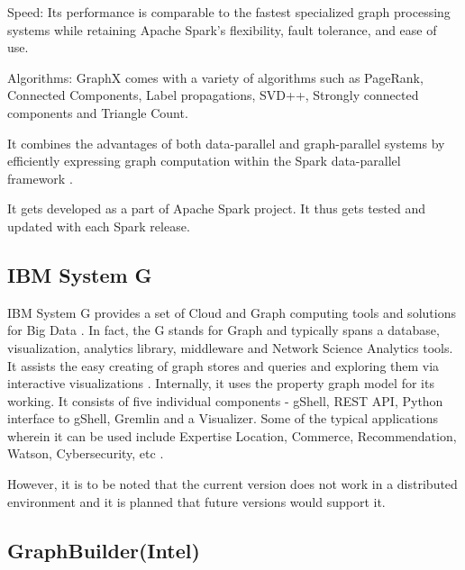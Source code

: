     Speed: Its performance is comparable to the fastest specialized
    graph processing systems while retaining Apache Spark's
    flexibility, fault tolerance, and ease of use.
    
    Algorithms: GraphX comes with a variety of algorithms such as
    PageRank, Connected Components, Label propagations, SVD++,
    Strongly connected components and Triangle Count.

    It combines the advantages of both data-parallel and
    graph-parallel systems by efficiently expressing graph
    computation within the Spark data-parallel
    framework \cite{www-graphX1}.

    It gets developed as a part of Apache Spark project. It thus gets
    tested and updated with each Spark release.
    
\subsection{IBM System G}

    IBM System G provides a set of Cloud and Graph computing tools and
    solutions for Big Data \cite{IBMSystemGDocumentation-1}.  In
    fact, the G stands for Graph and typically spans a database,
    visualization, analytics library, middleware and Network Science
    Analytics tools.  It assists the easy creating of graph stores 
    and queries and exploring them via interactive visualizations 
    \cite{IBMSystemGDocumentation-2}.  Internally, it uses the property
    graph model for its working.  It consists of five individual
    components - gShell, REST API, Python interface to gShell, Gremlin
    and a Visualizer.  Some of the typical applications wherein it
    can be used include Expertise Location, Commerce, Recommendation, 
    Watson, Cybersecurity, etc \cite{IBMSystemGPaper}.

    However, it is to be noted that the current version does not work
    in a distributed environment and it is planned that future
    versions would support it.
    
\subsection{GraphBuilder(Intel)}

